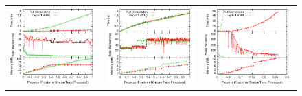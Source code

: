 \begin{figure}
\begin{center}

\begin{minipage}{\textwidth}
\begin{tabular}{ccc}
\includegraphics[width=\figurewidth]{../graphs/graphs/unified_tpch3.pdf} &
\includegraphics[width=\figurewidth]{../graphs/graphs/unified_tpch11.pdf} &
\includegraphics[width=\figurewidth]{../graphs/graphs/unified_ssb4.pdf} \\

\end{tabular}
\end{minipage}
\end{center}
\end{figure}
